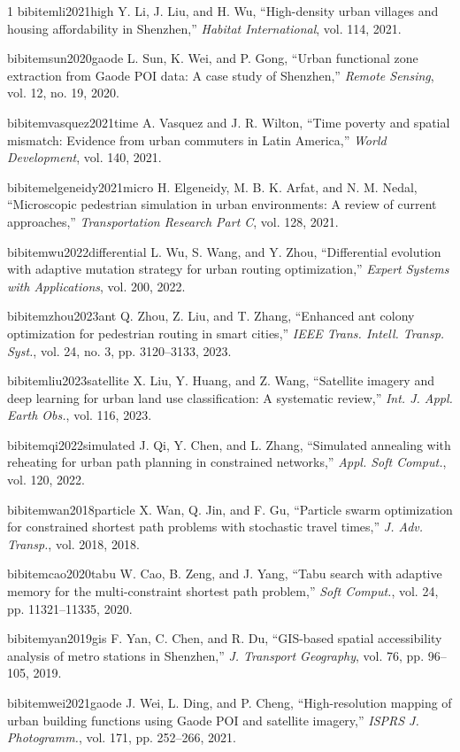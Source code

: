 \documentclass[journal]{IEEEtran}
\begin{document}
\begin{thebibliography}{1}
bibitem{li2021high} Y. Li, J. Liu, and H. Wu, ``High-density urban villages and housing affordability in Shenzhen,'' \emph{Habitat International}, vol. 114, 2021.

bibitem{sun2020gaode} L. Sun, K. Wei, and P. Gong, ``Urban functional zone extraction from Gaode POI data: A case study of Shenzhen,'' \emph{Remote Sensing}, vol. 12, no. 19, 2020.

bibitem{vasquez2021time} A. Vasquez and J. R. Wilton, ``Time poverty and spatial mismatch: Evidence from urban commuters in Latin America,'' \emph{World Development}, vol. 140, 2021.

bibitem{elgeneidy2021micro} H. Elgeneidy, M. B. K. Arfat, and N. M. Nedal, ``Microscopic pedestrian simulation in urban environments: A review of current approaches,'' \emph{Transportation Research Part C}, vol. 128, 2021.

bibitem{wu2022differential} L. Wu, S. Wang, and Y. Zhou, ``Differential evolution with adaptive mutation strategy for urban routing optimization,'' \emph{Expert Systems with Applications}, vol. 200, 2022.

bibitem{zhou2023ant} Q. Zhou, Z. Liu, and T. Zhang, ``Enhanced ant colony optimization for pedestrian routing in smart cities,'' \emph{IEEE Trans. Intell. Transp. Syst.}, vol. 24, no. 3, pp. 3120--3133, 2023.

bibitem{liu2023satellite} X. Liu, Y. Huang, and Z. Wang, ``Satellite imagery and deep learning for urban land use classification: A systematic review,'' \emph{Int. J. Appl. Earth Obs.}, vol. 116, 2023.

bibitem{qi2022simulated} J. Qi, Y. Chen, and L. Zhang, ``Simulated annealing with reheating for urban path planning in constrained networks,'' \emph{Appl. Soft Comput.}, vol. 120, 2022.

bibitem{wan2018particle} X. Wan, Q. Jin, and F. Gu, ``Particle swarm optimization for constrained shortest path problems with stochastic travel times,'' \emph{J. Adv. Transp.}, vol. 2018, 2018.

bibitem{cao2020tabu} W. Cao, B. Zeng, and J. Yang, ``Tabu search with adaptive memory for the multi-constraint shortest path problem,'' \emph{Soft Comput.}, vol. 24, pp. 11321--11335, 2020.

bibitem{yan2019gis} F. Yan, C. Chen, and R. Du, ``GIS-based spatial accessibility analysis of metro stations in Shenzhen,'' \emph{J. Transport Geography}, vol. 76, pp. 96--105, 2019.

bibitem{wei2021gaode} J. Wei, L. Ding, and P. Cheng, ``High-resolution mapping of urban building functions using Gaode POI and satellite imagery,'' \emph{ISPRS J. Photogramm.}, vol. 171, pp. 252--266, 2021.


\end{thebibliography}
\end{document}
